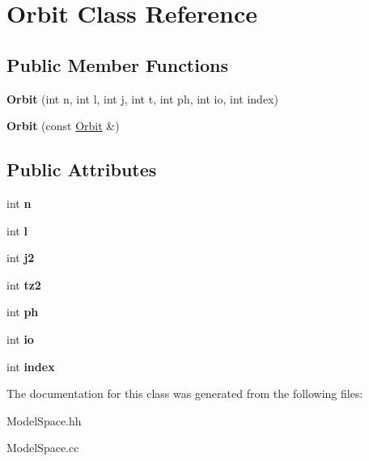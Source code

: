 \hypertarget{classOrbit}{\section{Orbit Class Reference}
\label{classOrbit}
}
\subsection*{Public Member Functions}
\begin{DoxyCompactItemize}
\item 
\hypertarget{classOrbit_a7917b9e13c319eb7d488dca885c4d6ad}{{\bfseries Orbit} (int n, int l, int j, int t, int ph, int io, int index)}\label{classOrbit_a7917b9e13c319eb7d488dca885c4d6ad}

\item 
\hypertarget{classOrbit_acc12b8fdfccd5dc2aacbf06baa7a9d03}{{\bfseries Orbit} (const \hyperlink{classOrbit}{Orbit} \&)}\label{classOrbit_acc12b8fdfccd5dc2aacbf06baa7a9d03}

\end{DoxyCompactItemize}
\subsection*{Public Attributes}
\begin{DoxyCompactItemize}
\item 
\hypertarget{classOrbit_a61c756b2fd626b9222fea5a2b4622eca}{int {\bfseries n}}\label{classOrbit_a61c756b2fd626b9222fea5a2b4622eca}

\item 
\hypertarget{classOrbit_a3b03c063df7856524db81274331d0e4b}{int {\bfseries l}}\label{classOrbit_a3b03c063df7856524db81274331d0e4b}

\item 
\hypertarget{classOrbit_a039f1fb20d41a2227bb61c2078e67d8b}{int {\bfseries j2}}\label{classOrbit_a039f1fb20d41a2227bb61c2078e67d8b}

\item 
\hypertarget{classOrbit_a9f9a4be881aa8b960b43fb3171617816}{int {\bfseries tz2}}\label{classOrbit_a9f9a4be881aa8b960b43fb3171617816}

\item 
\hypertarget{classOrbit_ad7624269be701b6b21555321818022d8}{int {\bfseries ph}}\label{classOrbit_ad7624269be701b6b21555321818022d8}

\item 
\hypertarget{classOrbit_ad0158269c44e38113a3da3ce0b94e638}{int {\bfseries io}}\label{classOrbit_ad0158269c44e38113a3da3ce0b94e638}

\item 
\hypertarget{classOrbit_aee34aabfabd6d77cb0cc55f591a6493c}{int {\bfseries index}}\label{classOrbit_aee34aabfabd6d77cb0cc55f591a6493c}

\end{DoxyCompactItemize}


The documentation for this class was generated from the following files\-:\begin{DoxyCompactItemize}
\item 
Model\-Space.\-hh\item 
Model\-Space.\-cc\end{DoxyCompactItemize}
